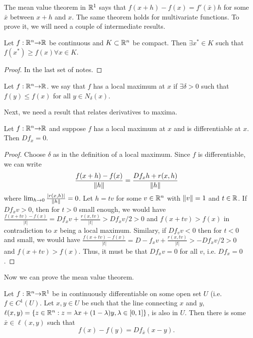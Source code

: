 The mean value theorem in $\mathbb{R}^1$ says that $f(x+h) - f(x) =
f'(\bar{x}) h$ for some $\bar{x}$ between $x+h$ and $x$. The same
theorem holds for multivariate functions. To prove it, we will need a
couple of intermediate results. 
\begin{theorem}
  Let $f:\mathbb{R}^n {\rightarrow} \mathbb{R}$ be continuous and $K \subset \mathbb{R}^n$ be
  compact. Then $\exists x^* \in K$ such that $f(x^*) \geq f(x)
  \forall x \in K$. 
\end{theorem}
\begin{proof}
  In the last set of notes.
\end{proof}
\begin{definition}
  Let $f: \mathbb{R}^n {\rightarrow} \mathbb{R}$. we say that $f$ has a local maximum at $x$ if
  $\exists \delta > 0$ such that $f(y) \leq f(x)$ for all $y \in
  N_\delta(x)$. 
\end{definition}
Next, we need a result that relates derivatives to maxima. 
\begin{theorem}\label{thm:localmax}
  Let $f: \mathbb{R}^n {\rightarrow} \mathbb{R}$ and suppose $f$ has a local maximum at $x$ and
  is differentiable at $x$. Then $Df_x = 0$. 
\end{theorem}
\begin{proof}
  Choose $\delta$ as in the definition of a local maximum. Since $f$
  is differentiable, we can write
  \[ \frac{f(x+h) - f(x)}{\left\Vert {h} \right\Vert} =\frac{ Df_x h +
    r(x,h)}{\left\Vert {h} \right\Vert} \] where $\lim_{h {\rightarrow} 0}
  \frac{|r(x,h)|}{\left\Vert {h} \right\Vert} = 0$. Let $h = t v$ for some $v \in \mathbb{R}^n$
  with $\left\Vert {v} \right\Vert =1$ and $t \in \mathbb{R}$. If $D f_x v > 0$, then for $t>0$
  small enough, we would have $\frac{f(x+tv) - f(x)}{|t|} = D
  f_x v + \frac{r(x,tv)}{|t|} > D
  f_x v / 2 > 0$ and $f(x+tv)> f(x)$ in contradiction to $x$ being a
  local maximum. Similary, if $D f_v v < 0$ then for $t<0$ and small,
  we would have $\frac{f(x+tv) - f(x)}{|t|} = D
  -f_x v + \frac{r(x,tv)}{|t|} > -D
  f_x v / 2 > 0$ and $f(x+tv)> f(x)$. Thus, it must be that $D f_x v =
  0$ for all $v$, i.e. $D f_x = 0$. 
\end{proof}
Now we can prove the mean value theorem.
\begin{theorem}\label{thm:mvt}
  Let $f:\mathbb{R}^n {\rightarrow} \mathbb{R}^1$ be in continuously differentiable on some open
  set $U$ (i.e. $f \in C^1(U)$. Let $x, y
  \in U$ be such that the line connecting $x$ and $y$, $\ell(x,y) =
  \{z\in \mathbb{R}^n: z = \lambda x + (1-\lambda) y, \lambda \in [0,1]\}$, is
  also in $U$. Then there is some $\bar{x} \in \ell(x,y)$ such that
  \[ f(x) - f(y) = Df_{\bar{x}} (x-y). \]
\end{theorem}
